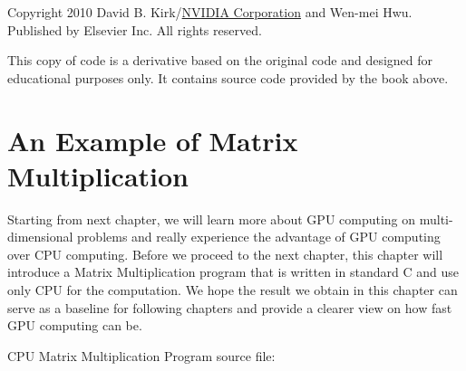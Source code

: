 \documentclass[letterpaper,10pt,openany,oneside]{sphinxmanual}
\begin{document}
Copyright 2010 David B. Kirk/\href{http://www.nvidia.com}{NVIDIA Corporation} and Wen-mei Hwu. Published by Elsevier Inc.  All rights reserved.

This copy of code is a derivative based on the original code and designed for educational purposes only. It contains source code provided by the book above.


\section{An Example of Matrix Multiplication}
\label{CUDA2D/CUDA2D:nvidia-corporation}\label{CUDA2D/CUDA2D:an-example-of-matrix-multiplication}
Starting from next chapter, we will learn more about GPU computing on multi-dimensional problems and really experience the advantage of GPU computing over CPU computing. Before we proceed to the next chapter, this chapter will introduce a Matrix Multiplication program that is written in standard C and use only CPU for the computation. We hope the result we obtain in this chapter can serve as a baseline for following chapters and provide a clearer view on how fast GPU computing can be.

CPU Matrix Multiplication Program source file:
\end{document}
